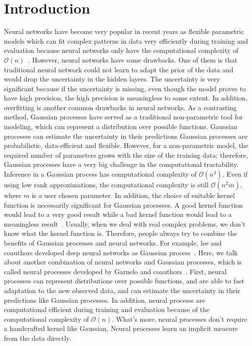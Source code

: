 \documentclass{article}
\begin{document}
\section{Introduction}
Neural networks have become very popular in recent years as flexible parametric models which can fit complex patterns in data very efficiently during training and evaluation because neural networks only have the computational complexity of $\mathcal{O}(n)$~\cite{Bishop2006,murphy2012machine,goodfellow2016deep}. However, neural networks have some drawbacks. One of them is that traditional neural network could not learn to adapt the prior of the data and would drop the uncertainty in the hidden layers. The uncertainty is very significant because if the uncertainty is missing, even though the model proves to have high precision, the high precision is meaningless to some extent. In addition, overfitting is another common drawbacks in neural networks. 
As a contrasting method, Gaussian processes have served as a traditional non-parametric tool for modeling, which can represent a distribution over possible functions. Gaussian processes can estimate the uncertainty in their predictions Gaussian processes are probabilistic, data-efficient and flexible. However, for a non-parametric model, the required number of parameters grows with the size of the training data; therefore, Gaussian processes have a very big challenge in the computational tractability. Inference in a Gaussian process has computational complexity of $\mathcal{O}(n^3)$. Even if using low rank approximations, the computational complexity is still $\mathcal{O}(n^2 m)$, where $m$ is a user chosen parameter. In addition, the choice of suitable kernel function is necessarily significant for Gaussian processes. A good kernel function would lead to a very good result while a bad kernel function would lead to a meaningless result~\cite{Bishop2006,murphy2012machine,Williams2006}. Usually, when we deal with real complex problems, we don't know what the kernel function is.
Therefore, people always try to combine the benefits of Gaussian processes and neural networks. For example, lee and coauthors developed deep neural networks as Gaussian process~\cite{lee2018deep}. Here, we talk about another combination of neural networks and Gaussian processes, which is called neural processes developed by Garnelo and coauthors~\cite{garnelo2018neural,garnelo2018conditional}. First, neural processes can represent distributions over possible functions, and are able to fast adaptation to the new observed data, and can estimate the uncertainty in their predictions like Gaussian processes. In addition, neural processs are computational efficient during training and evaluation because of the computational complexity of $\mathcal{O}(n)$. What's more, neural processes don't require a handcrafted kernel like Gaussian, Neural processes learn an implicit measure from the data directly.
\end{document}
